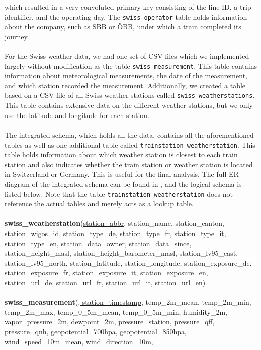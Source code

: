 which resulted in a very convoluted primary key consisting of the line ID,
a trip identifier, and the operating day.
The \texttt{swiss\_operator} table holds information about the company,
such as SBB or \"OBB,
under which a train completed its journey.\\\\
For the Swiss weather data, we had one set of CSV files
which we implemented largely without modification
as the table \texttt{swiss\_measurement}.
This table contains information about meteorological measurements,
the date of the measurement,
and which station recorded the measurement.
Additionally, we created a table based on a CSV file
of all Swiss weather stations called \texttt{swiss\_weatherstations}.
This table contains extensive data on the different weather stations,
but we only use the latitude and longitude for each station.\\\\
The integrated schema, which holds all the data,
contains all the aforementioned tables
as well as one additional table called
\texttt{trainstation\_weatherstation}.
This table holds information about which weather station
is closest to each train station
and also indicates whether the train station or weather station
is located in Switzerland or Germany.
This is useful for the final analysis.
The full ER diagram of the integrated schema
can be found in ,
and the logical schema is listed below.
Note that the table \texttt{trainstation\_weatherstation}
does not reference the actual tables
and merely acts as a lookup table.\\\\
\textbf{swiss\_weatherstation}(\underline{station\_abbr}, station\_name, station\_canton, station\_wigos\_id, 
station\_type\_de, station\_type\_fr, station\_type\_it, station\_type\_en, 
station\_data\_owner, station\_data\_since, station\_height\_masl, station\_height\_barometer\_masl, 
station\_lv95\_east, station\_lv95\_north, station\_latitude, station\_longitude, 
station\_exposure\_de, station\_exposure\_fr, station\_exposure\_it, station\_exposure\_en, 
station\_url\_de, station\_url\_fr, station\_url\_it, station\_url\_en)\\\\
\textbf{swiss\_measurement}(\underline{, station\_timestamp}, 
temp\_2m\_mean, temp\_2m\_min, temp\_2m\_max, temp\_0\_5m\_mean, temp\_0\_5m\_min,
humidity\_2m, vapor\_pressure\_2m, dewpoint\_2m, pressure\_station, pressure\_qff, pressure\_qnh,
geopotential\_700hpa, geopotential\_850hpa, wind\_speed\_10m\_mean, wind\_direction\_10m,

